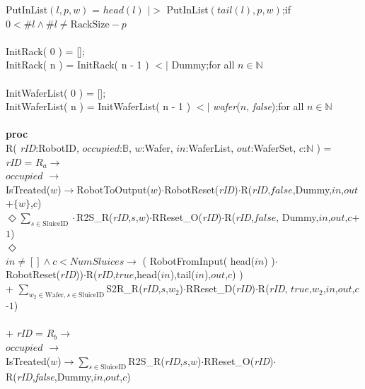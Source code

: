 \documentclass[12pt]{report}
\begin{document}
	\phantom{----} PutInList$( l, p, w )$ = $ head( l )$ $|>$ PutInList$( tail( l ), p, w )$;\hfill if $0 < \#l \land \#l \neq \text{RackSize} - p$\\
	\\
	\phantom{----} InitRack( 0 ) = [];\\
	\phantom{----} InitRack( n ) = InitRack( n - 1 ) $<|$ Dummy;\hfill for all $n \in \mathbb{N}$\\
	\\
	\phantom{----} InitWaferList( 0 ) = [];\\
	\phantom{----} InitWaferList( n ) = InitWaferList( n - 1 ) $<|$ \emph{wafer}($n$, \emph{false});\hfill for all $n \in \mathbb{N}$\\
	\\
	{\small
	\textbf{proc}\\
	\phantom{---} R( \emph{rID}:RobotID, $occupied$:$\mathbb{B}$, $w$:Wafer, $in$:WaferList, $out$:WaferSet, $c$:$\mathbb{N}$ ) =\\
	\phantom{-------} \emph{rID} = $R_a \rightarrow$\\
	\phantom{----------} $occupied$ $\rightarrow$\\
	\phantom{--------------} IsTreated($w$)$\rightarrow$RobotToOutput($w$)$\cdot$RobotReset(\emph{rID})$\cdot$R(\emph{rID},$false$,Dummy,$in$,$out$+$\{w\}$,$c$)\\
	\phantom{--------------} $\Diamond \sum\nolimits_{s \in \text{SluiceID}}\cdot$R2S\_R(\emph{rID},$s$,$w$)$\cdot$RReset\_O(\emph{rID})$\cdot$R(\emph{rID},$false$, Dummy,$in$,$out$,$c$+$1$)\\
	\phantom{----------} $\Diamond$\\
	\phantom{--------------} $in \neq [] \land c < NumSluices \rightarrow$ ( RobotFromInput( head($in$) )$\cdot$\\
	\phantom{---------------------} RobotReset(\emph{rID}))$\cdot$R(\emph{rID},$true$,head($in$),tail($in$),$out$,$c$) ) \\
	\phantom{--------------} + $\sum\nolimits_{w_2 \in \text{Wafer}, s \in \text{SluiceID}}$S2R\_R(\emph{rID},$s$,$w_2$)$\cdot$RReset\_D(\emph{rID})$\cdot$R(\emph{rID}, $true$,$w_2$,$in$,$out$,$c$-$1$)\\
	\\
	\phantom{-------} + \emph{rID} = $R_b \rightarrow$\\
	\phantom{----------} $occupied$ $\rightarrow$\\
	\phantom{--------------} IsTreated($w$)$\rightarrow\sum\nolimits_{s\in\text{SluiceID}}$R2S\_R(\emph{rID},$s$,$w$)$\cdot$RReset\_O(\emph{rID})$\cdot$R(\emph{rID},\emph{false},Dummy,$in$,$out$,$c$)\\
}
\end{document}
